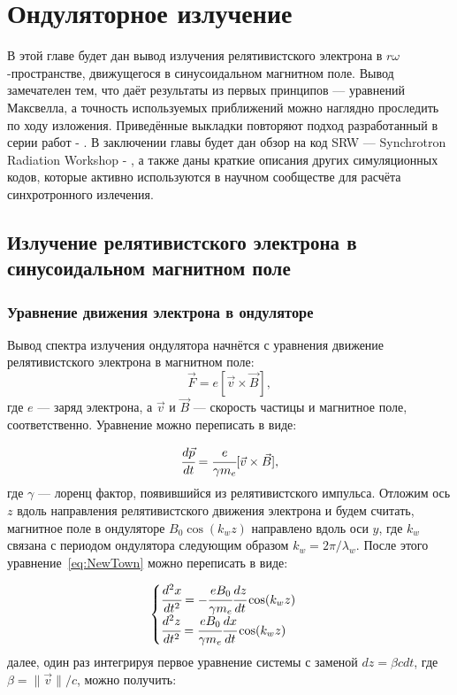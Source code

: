 \chapter{Ондуляторное излучение}
В этой главе будет дан вывод излучения релятивистского электрона в $r\omega$-пространстве, движущегося в синусоидальном магнитном поле. Вывод замечателен тем, что даёт результаты из первых принципов --- уравнений Максвелла, а точность используемых приближений можно наглядно проследить по ходу изложения. Приведённые выкладки повторяют подход разработанный в серии работ \cite{geloni2005paraxial} -
 \cite{geloni2006fourier}. В заключении главы будет дан обзор на код SRW --- Synchrotron Radiation Workshop \cite{SRW} - \cite{chubar1998proceedings}, а также даны краткие описания других симуляционных кодов, которые активно используются в научном сообществе для расчёта синхротронного излечения. 
\section{Излучение релятивистского электрона в синусоидальном магнитном поле}
\subsection{Уравнение движения электрона в ондуляторе}
Вывод спектра излучения ондулятора начнётся с уравнения движение релятивистского электрона в магнитном поле:
\begin{equation}
	\vec{F} = e[\vec{v} \times \vec{B}],
\end{equation} 
где $e$ --- заряд электрона, а $\vec{v}$ и $\vec{B}$ --- скорость частицы и магнитное поле, соответственно. Уравнение можно переписать в виде:

\begin{equation}
	\label{eq:NewTown}
	\cfrac{d\vec{p}}{dt} = \cfrac{e}{\gamma m_e}[\vec{v} \times \vec{B}],
\end{equation}
где $\gamma$ --- лоренц фактор, появившийся из релятивистского импульса. Отложим ось $z$ вдоль направления релятивистского движения электрона и будем считать, магнитное поле в ондуляторе $B_0\cos(k_w z)$ направлено вдоль оси $y$, где $k_w$ связана с периодом ондулятора следующим образом $k_w = 2\pi/\lambda_w$. После этого уравнение~\ref{eq:NewTown} можно переписать в виде:

\begin{equation}
	\label{eq:eq_of_motion}
	\begin{cases}
		\cfrac{d^2 x}{dt^2} = - \cfrac{e B_0}{\gamma m_e}\cfrac{dz}{dt} \cos(k_w z)\\
		\cfrac{d^2 z}{dt^2} = \cfrac{e B_0}{\gamma m_e}\cfrac{dx}{dt} \cos(k_w z)
	\end{cases} 
\end{equation}
далее, один раз интегрируя первое уравнение системы с заменой $dz = \beta cdt$, где $\beta = \|\vec{v}\| /c$, можно получить: 

